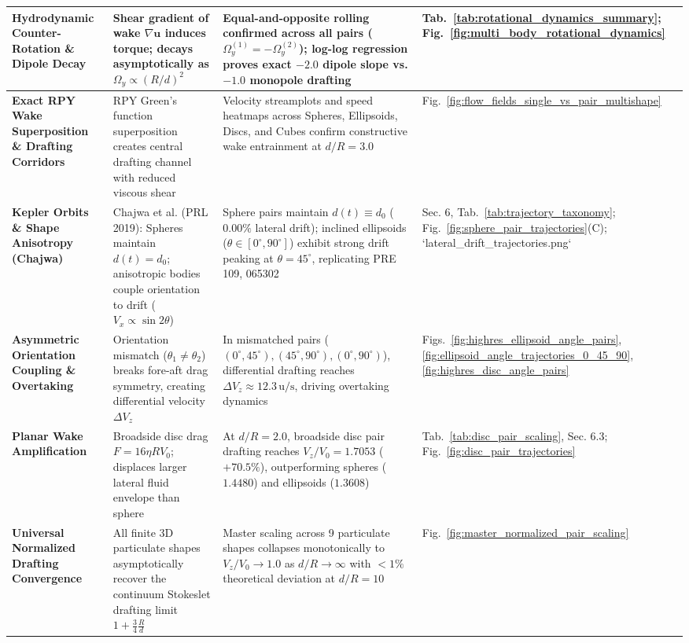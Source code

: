 \documentclass[11pt,a4paper]{article}
\begin{document}
\begin{table}[htbp]
\begin{tabular}{p{3.2cm}p{3.8cm}p{4.2cm}p{3.0cm}}
\midrule
\textbf{Hydrodynamic Counter-Rotation \& Dipole Decay} & Shear gradient of wake $\nabla \mathbf{u}$ induces torque; decays asymptotically as $\Omega_y \propto (R/d)^2$ & Equal-and-opposite rolling confirmed across all pairs ($\Omega_y^{(1)} = -\Omega_y^{(2)}$); log-log regression proves exact $-2.0$ dipole slope vs. $-1.0$ monopole drafting & Tab.~\ref{tab:rotational_dynamics_summary}; Fig.~\ref{fig:multi_body_rotational_dynamics} \\
\midrule
\textbf{Exact RPY Wake Superposition \& Drafting Corridors} & RPY Green's function superposition creates central drafting channel with reduced viscous shear & Velocity streamplots and speed heatmaps across Spheres, Ellipsoids, Discs, and Cubes confirm constructive wake entrainment at $d/R = 3.0$ & Fig.~\ref{fig:flow_fields_single_vs_pair_multishape} \\
\midrule
\textbf{Kepler Orbits \& Shape Anisotropy (Chajwa)} & Chajwa et al. (PRL 2019): Spheres maintain $d(t)=d_0$; anisotropic bodies couple orientation to drift ($V_x \propto \sin 2\theta$) & Sphere pairs maintain $d(t) \equiv d_0$ ($0.00\%$ lateral drift); inclined ellipsoids ($\theta \in [0^\circ, 90^\circ]$) exhibit strong drift peaking at $\theta = 45^\circ$, replicating PRE 109, 065302 & Sec. 6, Tab.~\ref{tab:trajectory_taxonomy}; Fig.~\ref{fig:sphere_pair_trajectories}(C); `lateral_drift_trajectories.png` \\
\midrule
\textbf{Asymmetric Orientation Coupling \& Overtaking} & Orientation mismatch ($\theta_1 \ne \theta_2$) breaks fore-aft drag symmetry, creating differential velocity $\Delta V_z$ & In mismatched pairs ($(0^\circ, 45^\circ), (45^\circ, 90^\circ), (0^\circ, 90^\circ)$), differential drafting reaches $\Delta V_z \approx 12.3\,\text{u/s}$, driving overtaking dynamics & Figs.~\ref{fig:highres_ellipsoid_angle_pairs}, \ref{fig:ellipsoid_angle_trajectories_0_45_90}, \ref{fig:highres_disc_angle_pairs} \\
\midrule
\textbf{Planar Wake Amplification} & Broadside disc drag $F = 16\eta R V_0$; displaces larger lateral fluid envelope than sphere & At $d/R = 2.0$, broadside disc pair drafting reaches $V_z/V_0 = 1.7053$ ($+70.5\%$), outperforming spheres ($1.4480$) and ellipsoids ($1.3608$) & Tab.~\ref{tab:disc_pair_scaling}, Sec. 6.3; Fig.~\ref{fig:disc_pair_trajectories} \\
\midrule
\textbf{Universal Normalized Drafting Convergence} & All finite 3D particulate shapes asymptotically recover the continuum Stokeslet drafting limit $1 + \frac{3}{4}\frac{R}{d}$ & Master scaling across 9 particulate shapes collapses monotonically to $V_z/V_0 \to 1.0$ as $d/R \to \infty$ with $< 1\%$ theoretical deviation at $d/R = 10$ & Fig.~\ref{fig:master_normalized_pair_scaling} \\
\bottomrule
\end{tabular}
\end{table}
\end{document}

